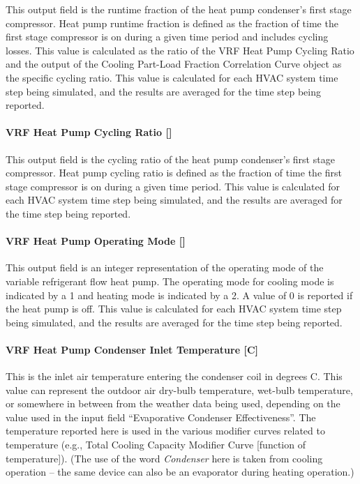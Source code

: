 This output field is the runtime fraction of the heat pump condenser's first stage compressor. Heat pump runtime fraction is defined as the fraction of time the first stage compressor is on during a given time period and includes cycling losses. This value is calculated as the ratio of the VRF Heat Pump Cycling Ratio and the output of the Cooling Part-Load Fraction Correlation Curve object as the specific cycling ratio. This value is calculated for each HVAC system time step being simulated, and the results are averaged for the time step being reported.

\paragraph{\texorpdfstring{VRF Heat Pump Cycling Ratio {[]}}{VRF Heat Pump Cycling Ratio }}\label{vrf-heat-pump-cycling-ratio}

This output field is the cycling ratio of the heat pump condenser's first stage compressor. Heat pump cycling ratio is defined as the fraction of time the first stage compressor is on during a given time period. This value is calculated for each HVAC system time step being simulated, and the results are averaged for the time step being reported.

\paragraph{\texorpdfstring{VRF Heat Pump Operating Mode {[]}}{VRF Heat Pump Operating Mode }}\label{vrf-heat-pump-operating-mode}

This output field is an integer representation of the operating mode of the variable refrigerant flow heat pump. The operating mode for cooling mode is indicated by a 1 and heating mode is indicated by a 2. A value of 0 is reported if the heat pump is off. This value is calculated for each HVAC system time step being simulated, and the results are averaged for the time step being reported.

\paragraph{VRF Heat Pump Condenser Inlet Temperature {[}C{]}}\label{vrf-heat-pump-condenser-inlet-temperature-c}

This is the inlet air temperature entering the condenser coil in degrees C. This value can represent the outdoor air dry-bulb temperature, wet-bulb temperature, or somewhere in between from the weather data being used, depending on the value used in the input field ``Evaporative Condenser Effectiveness''. The temperature reported here is used in the various modifier curves related to temperature (e.g., Total Cooling Capacity Modifier Curve {[}function of temperature{]}). (The use of the word \emph{Condenser} here is taken from cooling operation -- the same device can also be an evaporator during heating operation.)

